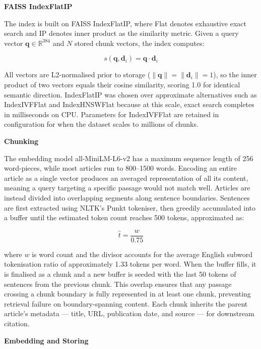 \textbf{FAISS IndexFlatIP}

The index is built on FAISS IndexFlatIP, where Flat denotes exhaustive exact search and IP denotes inner product as the similarity metric. Given a query vector $\mathbf{q} \in \mathbb{R}^{384}$ and $N$ stored chunk vectors, the index computes:

\begin{equation}
    s(\mathbf{q}, \mathbf{d}_i) = \mathbf{q} \cdot \mathbf{d}_i
\end{equation}

All vectors are L2-normalised prior to storage ($\|\mathbf{q}\| = \|\mathbf{d}_i\| = 1$), so the inner product of two vectors equals their cosine similarity, scoring 1.0 for identical semantic direction. IndexFlatIP was chosen over approximate alternatives such as IndexIVFFlat and IndexHNSWFlat because at this scale, exact search completes in milliseconds on CPU. Parameters for IndexIVFFlat are retained in configuration for when the dataset scales to millions of chunks.

\textbf{Chunking}

The embedding model all-MiniLM-L6-v2 has a maximum sequence length of 256 word-pieces, while most articles run to 800--1500 words. Encoding an entire article as a single vector produces an averaged representation of all its content, meaning a query targeting a specific passage would not match well. Articles are instead divided into overlapping segments along sentence boundaries. Sentences are first extracted using NLTK's Punkt tokeniser, then greedily accumulated into a buffer until the estimated token count reaches 500 tokens, approximated as:

\begin{equation}
    \hat{t} = \frac{w}{0.75}
\end{equation}

where $w$ is word count and the divisor accounts for the average English subword tokenisation ratio of approximately 1.33 tokens per word. When the buffer fills, it is finalised as a chunk and a new buffer is seeded with the last 50 tokens of sentences from the previous chunk. This overlap ensures that any passage crossing a chunk boundary is fully represented in at least one chunk, preventing retrieval failure on boundary-spanning content. Each chunk inherits the parent article's metadata --- title, URL, publication date, and source --- for downstream citation.

\textbf{Embedding and Storing}

